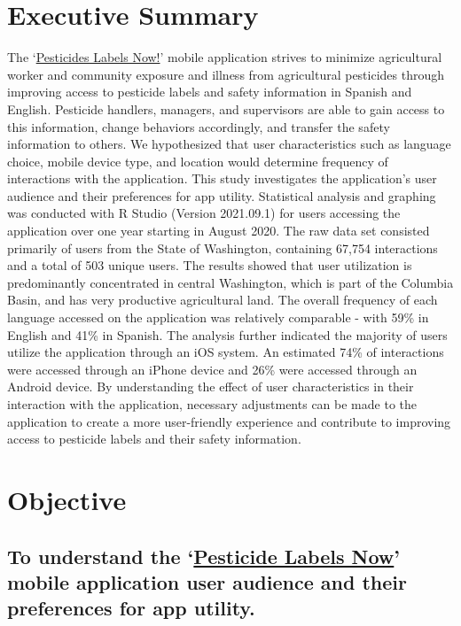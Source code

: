 \documentclass[
]{article}
\begin{document}
\hypertarget{executive-summary}{%
\section{Executive Summary}\label{executive-summary}}

The `\href{https://deohs.washington.edu/pnash/LabelsNow}{Pesticides
Labels Now!}' mobile application strives to minimize agricultural worker
and community exposure and illness from agricultural pesticides through
improving access to pesticide labels and safety information in Spanish
and English. Pesticide handlers, managers, and supervisors are able to
gain access to this information, change behaviors accordingly, and
transfer the safety information to others. We hypothesized that user
characteristics such as language choice, mobile device type, and
location would determine frequency of interactions with the application.
This study investigates the application's user audience and their
preferences for app utility. Statistical analysis and graphing was
conducted with R Studio (Version 2021.09.1) for users accessing the
application over one year starting in August 2020. The raw data set
consisted primarily of users from the State of Washington, containing
67,754 interactions and a total of 503 unique users. The results showed
that user utilization is predominantly concentrated in central
Washington, which is part of the Columbia Basin, and has very productive
agricultural land. The overall frequency of each language accessed on
the application was relatively comparable - with 59\% in English and
41\% in Spanish. The analysis further indicated the majority of users
utilize the application through an iOS system. An estimated 74\% of
interactions were accessed through an iPhone device and 26\% were
accessed through an Android device. By understanding the effect of user
characteristics in their interaction with the application, necessary
adjustments can be made to the application to create a more
user-friendly experience and contribute to improving access to pesticide
labels and their safety information.

\hypertarget{objective}{%
\section{Objective}\label{objective}}

\hypertarget{to-understand-the-pesticide-labels-now-mobile-application-user-audience-and-their-preferences-for-app-utility.}{%
\subsection{\texorpdfstring{To understand the
`\href{https://deohs.washington.edu/pnash/LabelsNow}{Pesticide Labels
Now}' mobile application user audience and their preferences for app
utility.}{To understand the `Pesticide Labels Now' mobile application user audience and their preferences for app utility.}}\label{to-understand-the-pesticide-labels-now-mobile-application-user-audience-and-their-preferences-for-app-utility.}}
\end{document}
